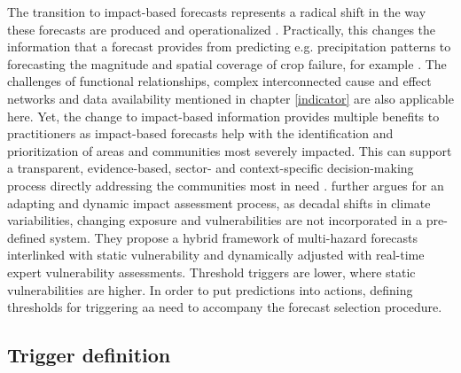 The transition to impact-based forecasts represents a radical shift in the way these forecasts are produced and operationalized \autocite{ifrcFbFPractitionersManual2023}. Practically, this changes the information that a forecast provides from predicting e.g. precipitation patterns to forecasting the magnitude and spatial coverage of crop failure, for example \autocite{harrowsmithFutureForecastImpact2020}. The challenges of functional relationships, complex interconnected cause and effect networks and data availability mentioned in chapter \ref{indicator} are also applicable here. Yet, the change to impact-based information provides multiple benefits to practitioners as impact-based forecasts help with the identification and prioritization of areas and communities most severely impacted. This can support a transparent, evidence-based, sector- and context-specific decision-making process directly addressing the communities most in need \autocite{ifrcFbFPractitionersManual2023}.\newline
\autocite{boultDroughtImpactbasedForecasting2022} further argues for an adapting and dynamic impact assessment process, as decadal shifts in climate variabilities, changing exposure and vulnerabilities are not incorporated in a pre-defined system. They propose a hybrid framework of multi-hazard forecasts interlinked with static vulnerability and dynamically adjusted with real-time expert vulnerability assessments. Threshold triggers are lower, where static vulnerabilities are higher. In order to put predictions into actions, defining thresholds for triggering \acrlong{aa} need to accompany the forecast selection procedure.

\subsection{Trigger definition}\label{subsec:trigger}

